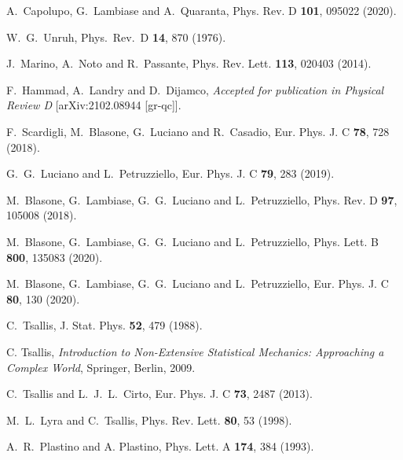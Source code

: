 \documentclass[floats,prd,aps,amssymb,nofootinbib,showkeys]{revtex4}
\begin{document}
\begin{thebibliography}{0}
A.~Capolupo, G.~Lambiase and A.~Quaranta,
Phys. Rev. D \textbf{101}, 095022 (2020). 

 W.~G.~Unruh,
  Phys.\ Rev.\ D {\bf 14}, 870 (1976).
  
 J.~Marino, A.~Noto and R.~Passante,
Phys. Rev. Lett. \textbf{113}, 020403 (2014).

F.~Hammad, A.~Landry and D.~Dijamco,
\emph{Accepted for publication in Physical Review D}
[arXiv:2102.08944 [gr-qc]].

 F.~Scardigli, M.~Blasone, G.~Luciano and R.~Casadio,
Eur. Phys. J. C \textbf{78}, 728 (2018).

G.~G.~Luciano and L.~Petruzziello,
Eur. Phys. J. C \textbf{79}, 283 (2019). 

M.~Blasone, G.~Lambiase, G.~G.~Luciano and L.~Petruzziello,
Phys. Rev. D \textbf{97}, 105008 (2018).

M.~Blasone, G.~Lambiase, G.~G.~Luciano and L.~Petruzziello,
Phys. Lett. B \textbf{800}, 135083 (2020).

M.~Blasone, G.~Lambiase, G.~G.~Luciano and L.~Petruzziello,
Eur. Phys. J. C \textbf{80}, 130 (2020). 
  
C.~Tsallis, J. Stat. Phys. {\bf 52}, 479 (1988).
  
C. Tsallis, \emph{Introduction to Non-Extensive Statistical Mechanics:
Approaching a Complex World}, Springer, Berlin, 2009.
  
C.~Tsallis and L.~J.~L.~Cirto, Eur. Phys. J. C {\bf 73}, 2487 (2013).
    
M.~L.~Lyra and C.~Tsallis, Phys. Rev. Lett. {\bf 80}, 53 (1998).
    
A.~R.~Plastino and A. Plastino, Phys. Lett. A {\bf174}, 384 (1993).
    

\end{thebibliography}
\end{document}
